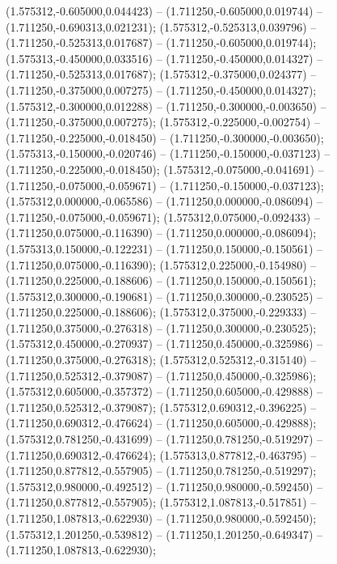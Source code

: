  (1.575312,-0.605000,0.044423) -- (1.711250,-0.605000,0.019744) -- (1.711250,-0.690313,0.021231);
 (1.575312,-0.525313,0.039796) -- (1.711250,-0.525313,0.017687) -- (1.711250,-0.605000,0.019744);
 (1.575313,-0.450000,0.033516) -- (1.711250,-0.450000,0.014327) -- (1.711250,-0.525313,0.017687);
 (1.575312,-0.375000,0.024377) -- (1.711250,-0.375000,0.007275) -- (1.711250,-0.450000,0.014327);
 (1.575312,-0.300000,0.012288) -- (1.711250,-0.300000,-0.003650) -- (1.711250,-0.375000,0.007275);
 (1.575312,-0.225000,-0.002754) -- (1.711250,-0.225000,-0.018450) -- (1.711250,-0.300000,-0.003650);
 (1.575313,-0.150000,-0.020746) -- (1.711250,-0.150000,-0.037123) -- (1.711250,-0.225000,-0.018450);
 (1.575312,-0.075000,-0.041691) -- (1.711250,-0.075000,-0.059671) -- (1.711250,-0.150000,-0.037123);
 (1.575312,0.000000,-0.065586) -- (1.711250,0.000000,-0.086094) -- (1.711250,-0.075000,-0.059671);
 (1.575312,0.075000,-0.092433) -- (1.711250,0.075000,-0.116390) -- (1.711250,0.000000,-0.086094);
 (1.575313,0.150000,-0.122231) -- (1.711250,0.150000,-0.150561) -- (1.711250,0.075000,-0.116390);
 (1.575312,0.225000,-0.154980) -- (1.711250,0.225000,-0.188606) -- (1.711250,0.150000,-0.150561);
 (1.575312,0.300000,-0.190681) -- (1.711250,0.300000,-0.230525) -- (1.711250,0.225000,-0.188606);
 (1.575312,0.375000,-0.229333) -- (1.711250,0.375000,-0.276318) -- (1.711250,0.300000,-0.230525);
 (1.575312,0.450000,-0.270937) -- (1.711250,0.450000,-0.325986) -- (1.711250,0.375000,-0.276318);
 (1.575312,0.525312,-0.315140) -- (1.711250,0.525312,-0.379087) -- (1.711250,0.450000,-0.325986);
 (1.575312,0.605000,-0.357372) -- (1.711250,0.605000,-0.429888) -- (1.711250,0.525312,-0.379087);
 (1.575312,0.690312,-0.396225) -- (1.711250,0.690312,-0.476624) -- (1.711250,0.605000,-0.429888);
 (1.575312,0.781250,-0.431699) -- (1.711250,0.781250,-0.519297) -- (1.711250,0.690312,-0.476624);
 (1.575313,0.877812,-0.463795) -- (1.711250,0.877812,-0.557905) -- (1.711250,0.781250,-0.519297);
 (1.575312,0.980000,-0.492512) -- (1.711250,0.980000,-0.592450) -- (1.711250,0.877812,-0.557905);
 (1.575312,1.087813,-0.517851) -- (1.711250,1.087813,-0.622930) -- (1.711250,0.980000,-0.592450);
 (1.575312,1.201250,-0.539812) -- (1.711250,1.201250,-0.649347) -- (1.711250,1.087813,-0.622930);
